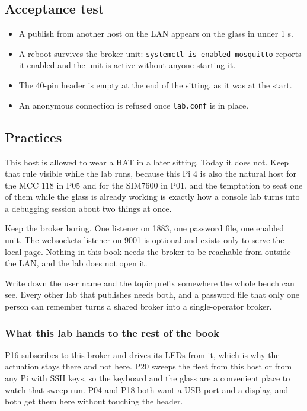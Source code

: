 \subsection*{Acceptance test}

\begin{itemize}
\item A publish from another host on the LAN appears on the glass in under 1 s.
\item A reboot survives the broker unit: \texttt{systemctl is-enabled mosquitto} reports it enabled and the unit is active without anyone starting it.
\item The 40-pin header is empty at the end of the sitting, as it was at the start.
\item An anonymous connection is refused once \texttt{lab.conf} is in place.
\end{itemize}

\subsection*{Practices}

This host is allowed to wear a HAT in a later sitting. Today it does not. Keep that rule visible while the lab runs, because this Pi 4 is also the natural host for the MCC 118 in P05 and for the SIM7600 in P01, and the temptation to seat one of them while the glass is already working is exactly how a console lab turns into a debugging session about two things at once.

Keep the broker boring. One listener on 1883, one password file, one enabled unit. The websockets listener on 9001 is optional and exists only to serve the local page. Nothing in this book needs the broker to be reachable from outside the LAN, and the lab does not open it.

Write down the user name and the topic prefix somewhere the whole bench can see. Every other lab that publishes needs both, and a password file that only one person can remember turns a shared broker into a single-operator broker.

\subsubsection*{What this lab hands to the rest of the book}

P16 subscribes to this broker and drives its LEDs from it, which is why the actuation stays there and not here. P20 sweeps the fleet from this host or from any Pi with SSH keys, so the keyboard and the glass are a convenient place to watch that sweep run. P04 and P18 both want a USB port and a display, and both get them here without touching the header.

